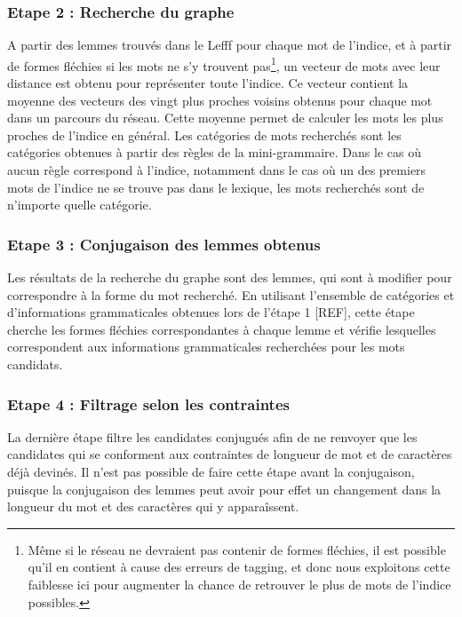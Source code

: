 \documentclass[a4paper, 12pt]{article}
\begin{document}
\subsubsection{Etape 2 : Recherche du graphe}

A partir des lemmes trouvés dans le Lefff pour chaque mot de l'indice, et à partir de formes fléchies si les mots ne s'y trouvent pas\footnote{Même si le réseau ne devraient pas contenir de formes fléchies, il est possible qu'il en contient à cause des erreurs de tagging, et donc nous exploitons cette faiblesse ici pour augmenter la chance de retrouver le plus de mots de l'indice possibles.}, un vecteur de mots avec leur distance est obtenu pour représenter toute l'indice. Ce vecteur contient la moyenne des vecteurs des vingt plus proches voisins obtenus pour chaque mot dans un parcours du réseau. Cette moyenne permet de calculer les mots les plus proches de l'indice en général. Les catégories de mots recherchés sont les catégories obtenues à partir des règles de la mini-grammaire. Dans le cas où aucun règle correspond à l'indice, notamment dans le cas où un des premiers mots de l'indice ne se trouve pas dans le lexique, les mots recherchés sont de n'importe quelle catégorie.

\subsubsection{Etape 3 : Conjugaison des lemmes obtenus}

Les résultats de la recherche du graphe sont des lemmes, qui sont à modifier pour correspondre à la forme du mot recherché. En utilisant l'ensemble de catégories et d'informations grammaticales obtenues lors de l'étape 1 [REF], cette étape cherche les formes fléchies correspondantes à chaque lemme et vérifie lesquelles correspondent aux informations grammaticales recherchées pour les mots candidats.

\subsubsection{Etape 4 : Filtrage selon les contraintes}

La dernière étape filtre les candidates conjugués afin de ne renvoyer que les candidates qui se conforment aux contraintes de longueur de mot et de caractères déjà devinés. Il n'est pas possible de faire cette étape avant la conjugaison, puisque la conjugaison des lemmes peut avoir pour effet un changement dans la longueur du mot et des caractères qui y apparaîssent.
\end{document}

